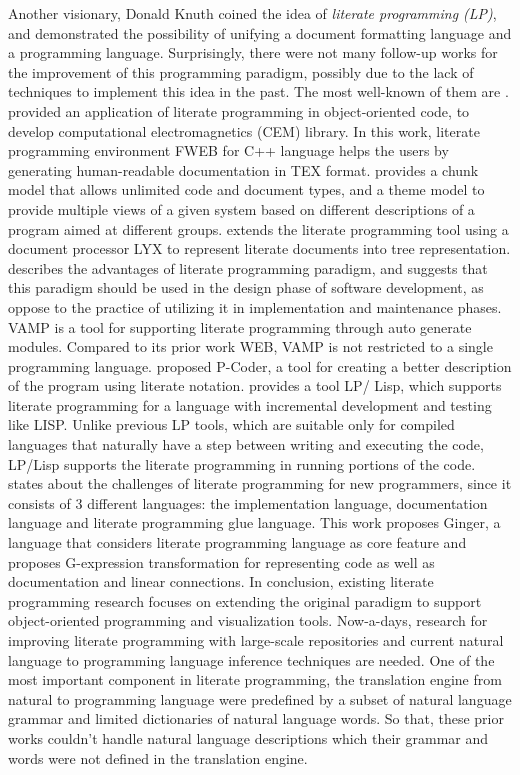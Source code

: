 \documentclass[11pt]{article}
\begin{document}
Another visionary, Donald Knuth \cite{Knuth:1984} coined the idea of \emph{literate programming (LP)}, and demonstrated the possibility of unifying a document formatting language and a programming language. Surprisingly, there were not many follow-up works for the improvement of this programming paradigm, possibly due to the lack of techniques to implement this idea in the past. The most well-known of them are \cite{Lymperopoulos:2005, Kacofegitis:2003, Anderson:2001, Brown:2002, Ammers:2002, Roy:2006, Roy:2010, Palmer:2009}.  \cite{Lymperopoulos:2005} provided an application of literate programming in object-oriented code, to develop computational electromagnetics (CEM) library. In this work, literate programming environment FWEB for C++ language helps the users by generating human-readable documentation in TEX format. \cite{Kacofegitis:2003} provides a chunk model that allows unlimited code and document types, and a theme model to provide multiple views of a given system based on different descriptions of a program aimed at different groups. \cite{Anderson:2001} extends the literate programming tool using a document processor LYX to represent literate documents into tree representation. \cite{Brown:2002} describes the advantages of literate programming paradigm, and suggests that this paradigm should be used in the design phase of software development, as oppose to the practice of utilizing it in implementation and maintenance phases. VAMP \cite{Ammers:2002} is a tool for supporting literate programming through auto generate modules. Compared to its prior work WEB, VAMP is not restricted to a single programming language. \cite{Roy:2006} proposed P-Coder, a tool for creating a better description of the program using literate notation. \cite{Roy:2010} provides a tool LP/ Lisp, which supports literate programming for a language with incremental development and testing like LISP. Unlike previous LP tools, which are suitable only for compiled languages that naturally have a step between writing and executing the code, LP/Lisp supports the literate programming in running portions of the code. \cite{Palmer:2009} states about the challenges of literate programming for new programmers, since it consists of 3 different languages: the implementation language, documentation language and literate programming glue language. This work proposes Ginger, a language that considers literate programming language as core feature and proposes G-expression transformation for representing %
code as well as documentation and linear connections. In conclusion, existing literate programming research focuses on extending the original paradigm to support object-oriented programming and visualization tools. Now-a-days, research for improving literate programming with large-scale repositories and current natural language to programming language inference techniques  are needed.  One of the most important component in literate programming, the translation engine from natural to programming language were predefined by a subset of natural language grammar and limited dictionaries of natural language words.  So that, these prior works couldn't handle natural language descriptions which their grammar and words were not defined in the translation engine.  
\end{document}
